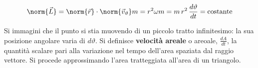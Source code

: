 \[
	\norm{\vec{L}}=\norm{\vec{r}} \cdot \norm{\vec{v}_\vartheta} m=r^2\omega m=m\,r^2\,\frac{d\vartheta}{dt}=\text{costante}
\]

Si immagini che il punto si stia muovendo di un piccolo tratto infinitesimo:  la sua posizione angolare varia di $d\vartheta$. Si definisce \textbf{velocità areale} o areoale, $\frac{dA}{dt}$, la quantità scalare pari alla variazione nel tempo dell'area spaziata dal raggio vettore. Si procede approssimando l'area tratteggiata all'area di un triangolo.

\begin{figure}[htpb]
	\centering

	 
	\tikzset{
	pattern size/.store in=\mcSize, 
	pattern size = 5pt,
	pattern thickness/.store in=\mcThickness, 
	pattern thickness = 0.3pt,
	pattern radius/.store in=\mcRadius, 
	pattern radius = 1pt}
	\makeatletter
	\makeatother

	\begin{tikzpicture}[x=0.75pt,y=0.75pt,yscale=-1,xscale=1]


\end{tikzpicture}
\end{figure}
